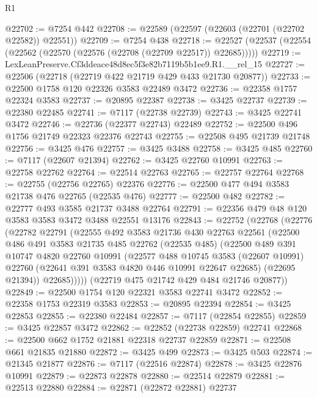 \begin{lexlean}{R1}
\begin{coremodule}
@22702 := @7254 @442
@22708 := @22589 (@22597 (@22603 (@22701 (@22702 @22582)) @22551))
@22709 := @7254 @438
@22718 := @22527 (@22537 (@22554 (@22562 (@22570 (@22576 (@22708 (@22709 @22517)) @22685)))))
@22719 := LexLeanPreserve.Cf3ddeace48d8ec5f3e82b7119b5b1ee9.R1.__rel_15
@22727 := @22506 (@22718 (@22719 @422 @21719 @429 @433 @21730 @20877))
@22733 := @22500 @1758 @120 @22326 @3583 @22489 @3472
@22736 := @22358 @1757 @22324 @3583
@22737 := @20895 @22387
@22738 := @3425 @22737
@22739 := @22380 @22485
@22741 := @7117 (@22738 @22739)
@22743 := @3425 @22741 @3472
@22746 := @22736 (@22377 @22743) @22489
@22752 := @22500 @496 @1756 @21749 @22323 @22376 @22743
@22755 := @22508 @495 @21739 @21748
@22756 := @3425 @476
@22757 := @3425 @3488
@22758 := @3425 @485
@22760 := @7117 (@22607 @21394)
@22762 := @3425 @22760 @10991
@22763 := @22758 @22762
@22764 := @22514 @22763
@22765 := @22757 @22764
@22768 := @22755 (@22756 @22765) @22376
@22776 := @22500 @477 @494 @3583 @21738 @476 @22765 (@22535 @476)
@22777 := @22500 @482
@22782 := @22777 @493 @3585 @21737 @3488 @22764
@22791 := @22356 @479 @48 @120 @3583 @3583 @3472 @3488 @22551 @13176
@22843 := @22752
    (@22768
      (@22776
        (@22782
          @22791
          (@22555
            @492
            @3583
            @21736
            @430
            @22763
            @22561
            (@22500
              @486
              @491
              @3583
              @21735
              @485
              @22762
              (@22535 @485)
              (@22500
                @489
                @391
                @10747
                @4820
                @22760
                @10991
                (@22577
                  @488
                  @10745
                  @3583
                  (@22607 @10991)
                  @22760
                  (@22641 @391 @3583 @4820 @446 @10991 @22647 @22685)
                  (@22695 @21394))
                @22685)))))
      (@22719 @475 @21742 @429 @484 @21746 @20877))
@22849 := @22500 @1754 @120 @22321 @3583 @22741 @3472
@22852 := @22358 @1753 @22319 @3583
@22853 := @20895 @22394
@22854 := @3425 @22853
@22855 := @22380 @22484
@22857 := @7117 (@22854 @22855)
@22859 := @3425 @22857 @3472
@22862 := @22852 (@22738 @22859) @22741
@22868 := @22500 @662 @1752 @21881 @22318 @22737 @22859
@22871 := @22508 @661 @21835 @21880
@22872 := @3425 @499
@22873 := @3425 @503
@22874 := @21345 @21877
@22876 := @7117 (@22516 @22874)
@22878 := @3425 @22876 @10991
@22879 := @22873 @22878
@22880 := @22514 @22879
@22881 := @22513 @22880
@22884 := @22871 (@22872 @22881) @22737

\end{coremodule}
\end{lexlean}

